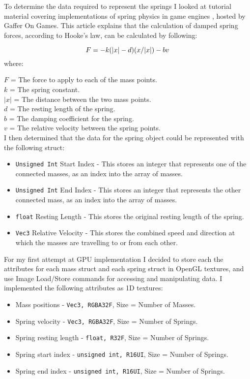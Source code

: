 \documentclass[]{acmsiggraph}
\begin{document}
To determine the data required to represent the springs I looked at tutorial material covering implementations of spring physics in game engines \cite{gafferSpring}, hosted by Gaffer On Games. This article explains that the calculation of damped spring forces, according to Hooke's law, can be calculated by following:

\begin{equation}
	F = -k(|x|-d)(x/|x|) - bv \\
\end{equation}
where:

$F$ = The force to apply to each of the mass points. \\
$k$ = The spring constant. \\
$|x|$ = The distance between the two mass points. \\
$d$ = The resting length of the spring. \\
$b$ = The damping coefficient for the spring. \\
$v$ = The relative velocity between the spring points. \\
I then determined that the data for the spring object could be represented with the following struct:
\begin{itemize}
	\item \lstinline{Unsigned Int} Start Index - This stores an integer that represents one of the connected masses, as an index into the array of masses.
	\item \lstinline{Unsigned Int} End Index - This stores an integer that represents the other connected mass, as an index into the array of masses.
	\item \lstinline{float} Resting Length - This stores the original resting length of the spring.
	\item \lstinline{Vec3} Relative Velocity - This stores the combined speed and direction at which the masses are travelling to or from each other.
\end{itemize}

For my first attempt at GPU implementation I decided to store each the attributes for each mass struct and each spring struct in OpenGL textures, and use Image Load/Store commands for accessing and manipulating data. I implemented the following attributes as 1D textures:

\begin{itemize}
	\item Mass positions - \lstinline{Vec3, RGBA32F}, Size = Number of Masses.
	\item Spring velocity - \lstinline{Vec3, RGBA32F}, Size = Number of Springs.
	\item Spring resting length - \lstinline{float, R32F}, Size = Number of Springs.
	\item Spring start index - \lstinline{unsigned int, R16UI}, Size = Number of Springs.
	\item Spring end index - \lstinline{unsigned int, R16UI}, Size = Number of Springs.
\end{itemize}
\end{document}
